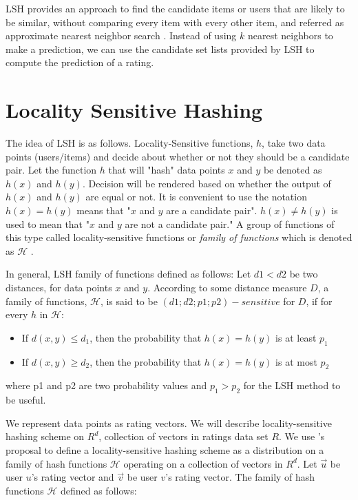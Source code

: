 \documentclass[conference]{IEEEtran}
\begin{document}
LSH provides an approach to find the candidate items or users that are likely 
to be similar, without comparing every item with every other item, and referred
as approximate nearest neighbor search \cite{Rajaraman:2011:MMD:2124405}. 
Instead of using $k$ nearest neighbors to make a prediction, we can use the candidate 
set lists provided by LSH to compute the prediction of a rating. 


\section{Locality Sensitive Hashing}
\label{sec:lsh}

The idea of LSH is as follows. Locality-Sensitive functions, $h$, take two data
points (users/items) and decide about whether or not they should be a candidate
pair. Let the function $h$ that will "hash" data points $x$ and $y$ be denoted 
as $h(x)$ and $h(y)$. Decision will be rendered based on whether the output of
$h(x)$ and $h(y)$ are equal or not. It is convenient to use the notation 
$h(x) = h(y)$ means that "$x$ and $y$ are a candidate pair". $h(x) \neq h(y)$ 
is used to mean that "$x$ and $y$ are not a candidate pair." A group of functions 
of this type called locality-sensitive functions or \textit{family of functions}
which is denoted as $\mathcal{H}$ \cite[p.~86]{Rajaraman:2011:MMD:2124405}.

In general, LSH family of functions defined as follows: Let $d1 < d2$ be two
distances, for data points $x$ and $y$. According to some distance measure $D$,
a family of functions, $\mathcal{H}$, is said to be $(d1; d2; p1; p2)-sensitive$ 
for $D$, if for every $h$ in $\mathcal{H}$:

\begin{itemize}
\item If $d(x, y) \leq d_1$, then the probability that $h(x) = h(y)$ is at least $p_1$
\item If $d(x, y) \geq d_2$, then the probability that $h(x) = h(y)$ is at most $p_2$
\end{itemize}

where p1 and p2 are two probability values and $p_1 > p_2$ for the LSH method
to be useful.

We represent data points as rating vectors. We will describe locality-sensitive
hashing scheme on $R^d$, collection of vectors in ratings data set $R$. We use
\cite{DBLP:conf/stoc/Charikar02}'s proposal to define a locality-sensitive 
hashing scheme as a distribution on a family of hash functions $\mathcal{H}$
operating on a collection of vectors in $R^d$. Let $\vec{u}$ be user $u$'s 
rating vector and $\vec{v}$ be user $v$'s rating vector. The family of hash 
functions $\mathcal{H}$ defined as follows:
\end{document}
